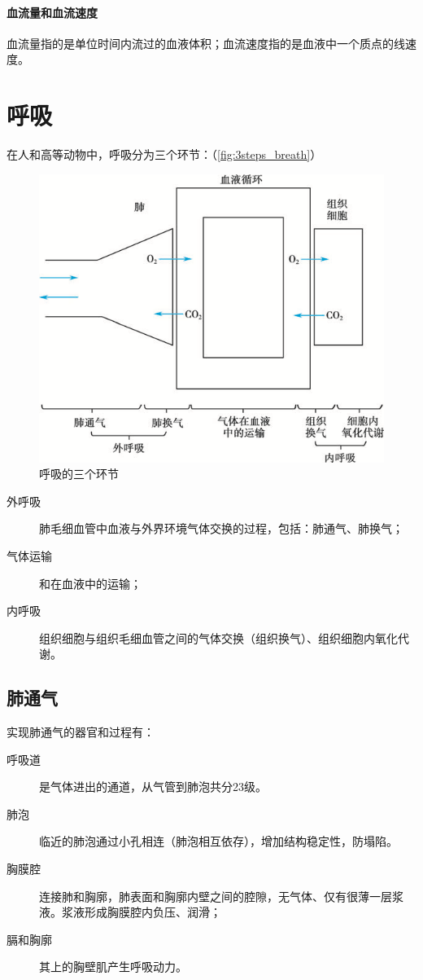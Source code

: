 \paragraph{血流量和血流速度}

血流量指的是单位时间内流过的血液体积；血流速度指的是血液中一个质点的线速度。

\section{呼吸}

在人和高等动物中，呼吸分为三个环节：（\autoref{fig:3steps_breath}）
\begin{figure}[htbp]
	\centering
	\includegraphics[width=0.7\linewidth]{Pics/呼吸的三个环节}
	\caption{呼吸的三个环节}
	\label{fig:3steps_breath}
\end{figure}

\begin{description}
	\item[外呼吸] 肺毛细血管中血液与外界环境气体交换的过程，包括：肺通气、肺换气；
	\item[气体运输] 和在血液中的运输；
	\item[内呼吸] 组织细胞与组织毛细血管之间的气体交换（组织换气）、组织细胞内氧化代谢。
\end{description}

\subsection{肺通气}

实现肺通气的器官和过程有：
\begin{description}
	\item[呼吸道] 是气体进出的通道，从气管到肺泡共分23级。
	\item[肺泡] 临近的肺泡通过小孔相连（肺泡相互依存），增加结构稳定性，防塌陷。
	\item[胸膜腔] 连接肺和胸廓，肺表面和胸廓内壁之间的腔隙，无气体、仅有很薄一层浆液。浆液形成胸膜腔内负压、润滑；
	\item[膈和胸廓] 其上的胸壁肌产生呼吸动力。
\end{description}

